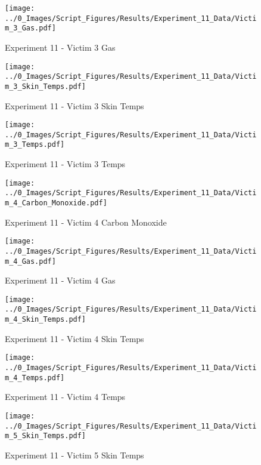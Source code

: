 	\begin{figure}[H]
		\centering
		\texttt{[image: ../0\_Images/Script\_Figures/Results/Experiment\_11\_Data/Victim\_3\_Gas.pdf]}
		\caption[]{Experiment 11 - Victim 3 Gas}
	\end{figure}
 
	\clearpage

	\begin{figure}[H]
		\centering
		\texttt{[image: ../0\_Images/Script\_Figures/Results/Experiment\_11\_Data/Victim\_3\_Skin\_Temps.pdf]}
		\caption[]{Experiment 11 - Victim 3 Skin Temps}
	\end{figure}
 

	\begin{figure}[H]
		\centering
		\texttt{[image: ../0\_Images/Script\_Figures/Results/Experiment\_11\_Data/Victim\_3\_Temps.pdf]}
		\caption[]{Experiment 11 - Victim 3 Temps}
	\end{figure}
 
	\clearpage

	\begin{figure}[H]
		\centering
		\texttt{[image: ../0\_Images/Script\_Figures/Results/Experiment\_11\_Data/Victim\_4\_Carbon\_Monoxide.pdf]}
		\caption[]{Experiment 11 - Victim 4 Carbon Monoxide}
	\end{figure}
 

	\begin{figure}[H]
		\centering
		\texttt{[image: ../0\_Images/Script\_Figures/Results/Experiment\_11\_Data/Victim\_4\_Gas.pdf]}
		\caption[]{Experiment 11 - Victim 4 Gas}
	\end{figure}
 
	\clearpage

	\begin{figure}[H]
		\centering
		\texttt{[image: ../0\_Images/Script\_Figures/Results/Experiment\_11\_Data/Victim\_4\_Skin\_Temps.pdf]}
		\caption[]{Experiment 11 - Victim 4 Skin Temps}
	\end{figure}
 

	\begin{figure}[H]
		\centering
		\texttt{[image: ../0\_Images/Script\_Figures/Results/Experiment\_11\_Data/Victim\_4\_Temps.pdf]}
		\caption[]{Experiment 11 - Victim 4 Temps}
	\end{figure}
 
	\clearpage

	\begin{figure}[H]
		\centering
		\texttt{[image: ../0\_Images/Script\_Figures/Results/Experiment\_11\_Data/Victim\_5\_Skin\_Temps.pdf]}
		\caption[]{Experiment 11 - Victim 5 Skin Temps}
	\end{figure}
 

